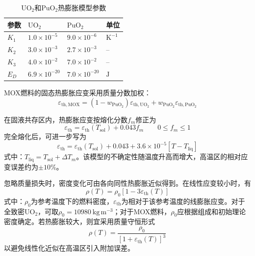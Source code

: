 \begin{table}[htbp]
	\centering
	\caption{$\mathrm{UO}_2$和$\mathrm{PuO}_2$热膨胀模型参数}
	\label{tab:mox_thermal_expansion_parameters}
	\begin{tabularx}{\textwidth}{
			>{\centering\arraybackslash}p{}
			>{\centering\arraybackslash}X
			>{\centering\arraybackslash}X
			>{\centering\arraybackslash}p{}
		}
		\toprule
		参数 & $\mathrm{UO}_2$ & $\mathrm{PuO}_2$ & 单位 \\
		\midrule
		$K_1$ & $1.0\times10^{-5}$  & $9.0\times10^{-6}$  & $\mathrm{K^{-1}}$ \\
		$K_2$ & $3.0\times10^{-3}$  & $2.7\times10^{-3}$  & -- \\
		$K_3$ & $4.0\times10^{-2}$  & $7.0\times10^{-2}$  & -- \\
		$E_D$ & $6.9\times10^{-20}$ & $7.0\times10^{-20}$ & $\mathrm{J}$ \\
		\bottomrule
	\end{tabularx}
\end{table}

MOX燃料的固态热膨胀应变采用质量分数加权：
\begin{equation}
	\varepsilon_{\mathrm{th},\mathrm{MOX}}
	=(1-w_{\mathrm{PuO}_2})\varepsilon_{\mathrm{th},\mathrm{UO}_2}
	+w_{\mathrm{PuO}_2}\varepsilon_{\mathrm{th},\mathrm{PuO}_2}
	\label{eq:mox_solid_thermal_expansion}
\end{equation}

在固液共存区内，热膨胀应变按熔化分数$f_m$修正为
\begin{equation}
	\varepsilon_{\mathrm{th}}
	=\varepsilon_{\mathrm{th}}(T_{\mathrm{sol}})+0.043f_m
	\qquad 0\leq f_m\leq1
	\label{eq:mox_partial_melting_expansion}
\end{equation}
完全熔化后，可进一步写为
\begin{equation}
	\varepsilon_{\mathrm{th}}
	=\varepsilon_{\mathrm{th}}(T_{\mathrm{sol}})+0.043
	+3.6\times10^{-5}\left[T-T_{\mathrm{liq}}\right]
	\label{eq:mox_liquid_expansion}
\end{equation}
式中：$T_{\mathrm{liq}}=T_{\mathrm{sol}}+\Delta T_m$。该模型的不确定性随温度升高而增大，高温区的相对应变误差约为$\pm10\%$。


忽略质量损失时，密度变化可由各向同性热膨胀近似得到。在线性应变较小时，有
\begin{equation}
	\rho(T)=\rho_0\left[1-3\varepsilon_{\mathrm{th}}(T)\right]
	\label{eq:mox_density_linearized}
\end{equation}
式中：$\rho_0$为参考温度下的燃料密度，$\varepsilon_{\mathrm{th}}$为相对于该参考温度的线膨胀应变。对于全致密$\mathrm{UO}_2$，可取$\rho_0=10980\ \mathrm{kg\,m^{-3}}$；对于MOX燃料，$\rho_0$应根据组成和初始理论密度确定。若热膨胀较大，则宜采用质量守恒形式
\begin{equation}
	\rho(T)=\frac{\rho_0}{\left[1+\varepsilon_{\mathrm{th}}(T)\right]^3}
	\label{eq:mox_density_exact}
\end{equation}
以避免线性化近似在高温区引入附加误差。

